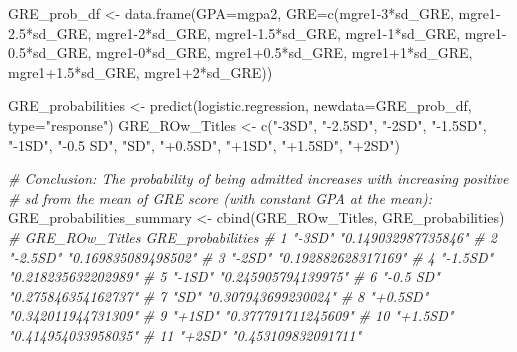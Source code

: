\documentclass[
]{article}
\newenvironment{Shaded}{\begin{snugshade}}{\end{snugshade}}
\newcommand{\AttributeTok}[1]{\textcolor[rgb]{0.77,0.63,0.00}{#1}}
\newcommand{\CommentTok}[1]{\textcolor[rgb]{0.56,0.35,0.01}{\textit{#1}}}
\newcommand{\DecValTok}[1]{\textcolor[rgb]{0.00,0.00,0.81}{#1}}
\newcommand{\FloatTok}[1]{\textcolor[rgb]{0.00,0.00,0.81}{#1}}
\newcommand{\FunctionTok}[1]{\textcolor[rgb]{0.00,0.00,0.00}{#1}}
\newcommand{\NormalTok}[1]{#1}
\newcommand{\OtherTok}[1]{\textcolor[rgb]{0.56,0.35,0.01}{#1}}
\newcommand{\SpecialCharTok}[1]{\textcolor[rgb]{0.00,0.00,0.00}{#1}}
\newcommand{\StringTok}[1]{\textcolor[rgb]{0.31,0.60,0.02}{#1}}
\begin{document}
\begin{Shaded}
\begin{Highlighting}[]
\NormalTok{GRE\_prob\_df }\OtherTok{\textless{}{-}} \FunctionTok{data.frame}\NormalTok{(}\AttributeTok{GPA=}\NormalTok{mgpa2, }\AttributeTok{GRE=}\FunctionTok{c}\NormalTok{(mgre1}\DecValTok{{-}3}\SpecialCharTok{*}\NormalTok{sd\_GRE, mgre1}\FloatTok{{-}2.5}\SpecialCharTok{*}\NormalTok{sd\_GRE, mgre1}\DecValTok{{-}2}\SpecialCharTok{*}\NormalTok{sd\_GRE, mgre1}\FloatTok{{-}1.5}\SpecialCharTok{*}\NormalTok{sd\_GRE, }
\NormalTok{                                           mgre1}\DecValTok{{-}1}\SpecialCharTok{*}\NormalTok{sd\_GRE, mgre1}\FloatTok{{-}0.5}\SpecialCharTok{*}\NormalTok{sd\_GRE, mgre1}\DecValTok{{-}0}\SpecialCharTok{*}\NormalTok{sd\_GRE, mgre1}\FloatTok{+0.5}\SpecialCharTok{*}\NormalTok{sd\_GRE,}
\NormalTok{                                           mgre1}\SpecialCharTok{+}\DecValTok{1}\SpecialCharTok{*}\NormalTok{sd\_GRE, mgre1}\FloatTok{+1.5}\SpecialCharTok{*}\NormalTok{sd\_GRE, mgre1}\SpecialCharTok{+}\DecValTok{2}\SpecialCharTok{*}\NormalTok{sd\_GRE))}

\NormalTok{GRE\_probabilities }\OtherTok{\textless{}{-}} \FunctionTok{predict}\NormalTok{(logistic.regression, }\AttributeTok{newdata=}\NormalTok{GRE\_prob\_df, }\AttributeTok{type=}\StringTok{"response"}\NormalTok{)}
\NormalTok{GRE\_ROw\_Titles }\OtherTok{\textless{}{-}} \FunctionTok{c}\NormalTok{(}\StringTok{"{-}3SD"}\NormalTok{, }\StringTok{"{-}2.5SD"}\NormalTok{, }\StringTok{"{-}2SD"}\NormalTok{, }\StringTok{"{-}1.5SD"}\NormalTok{, }\StringTok{"{-}1SD"}\NormalTok{, }\StringTok{"{-}0.5 SD"}\NormalTok{, }\StringTok{"SD"}\NormalTok{, }\StringTok{"+0.5SD"}\NormalTok{, }\StringTok{"+1SD"}\NormalTok{, }\StringTok{"+1.5SD"}\NormalTok{,}
                    \StringTok{"+2SD"}\NormalTok{)}


\CommentTok{\# Conclusion: The probability of being admitted increases with increasing positive}
\CommentTok{\# sd from the mean of GRE score (with constant GPA at the mean):}
\NormalTok{GRE\_probabilities\_summary }\OtherTok{\textless{}{-}} \FunctionTok{cbind}\NormalTok{(GRE\_ROw\_Titles, GRE\_probabilities)}
    \CommentTok{\# GRE\_ROw\_Titles GRE\_probabilities  }
    \CommentTok{\# 1  "{-}3SD"         "0.149032987735846"}
    \CommentTok{\# 2  "{-}2.5SD"       "0.169835089498502"}
    \CommentTok{\# 3  "{-}2SD"         "0.192882628317169"}
    \CommentTok{\# 4  "{-}1.5SD"       "0.218235632202989"}
    \CommentTok{\# 5  "{-}1SD"         "0.245905794139975"}
    \CommentTok{\# 6  "{-}0.5 SD"      "0.275846354162737"}
    \CommentTok{\# 7  "SD"           "0.307943699230024"}
    \CommentTok{\# 8  "+0.5SD"       "0.342011944731309"}
    \CommentTok{\# 9  "+1SD"         "0.377791711245609"}
    \CommentTok{\# 10 "+1.5SD"       "0.414954033958035"}
    \CommentTok{\# 11 "+2SD"         "0.453109832091711"}



\end{Highlighting}
\end{Shaded}
\end{document}
